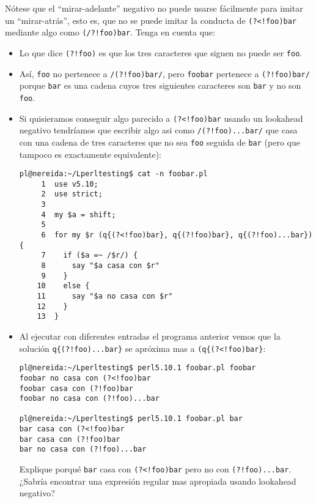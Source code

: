 
Nótese que el ``mirar-adelante'' negativo
no puede usarse fácilmente para imitar un ``mirar-atrás'',
esto es, que no se puede imitar la conducta de
\verb|(?<!foo)bar| mediante
algo como \verb|(/?!foo)bar|. Tenga en cuenta que:

\begin{itemize}

\item
Lo que 
dice \verb|(?!foo)| es que los tres caracteres que siguen no puede ser \verb"foo".  

\item
Así, \verb|foo| no pertenece a \verb|/(?!foo)bar/|, pero
\verb|foobar| pertenece a  \verb|(?!foo)bar/| porque \verb|bar| es una cadena
cuyos tres siguientes caracteres son \verb|bar| y no son \verb|foo|.

\item
Si quisieramos conseguir algo parecido a \verb|(?<!foo)bar| usando un lookahead negativo
tendríamos que escribir algo asi como
\verb|/(?!foo)...bar/| que casa con una cadena de tres caracteres que no sea \verb|foo| seguida de 
\verb|bar| (pero que tampoco es exactamente equivalente):
\begin{verbatim}
pl@nereida:~/Lperltesting$ cat -n foobar.pl
     1  use v5.10;
     2  use strict;
     3
     4  my $a = shift;
     5
     6  for my $r (q{(?<!foo)bar}, q{(?!foo)bar}, q{(?!foo)...bar}) {
     7    if ($a =~ /$r/) {
     8      say "$a casa con $r"
     9    }
    10    else {
    11      say "$a no casa con $r"
    12    }
    13  }
\end{verbatim}

\item
Al ejecutar con diferentes entradas el programa anterior vemos que la solución 
\verb|q{(?!foo)...bar}| se apróxima mas a \verb|(q{(?<!foo)bar}|:
\begin{verbatim}
pl@nereida:~/Lperltesting$ perl5.10.1 foobar.pl foobar
foobar no casa con (?<!foo)bar
foobar casa con (?!foo)bar
foobar no casa con (?!foo)...bar

pl@nereida:~/Lperltesting$ perl5.10.1 foobar.pl bar
bar casa con (?<!foo)bar
bar casa con (?!foo)bar
bar no casa con (?!foo)...bar
\end{verbatim}

\begin{exercise}
Explique porqué \verb|bar| casa con \verb|(?<!foo)bar| pero no con \verb|(?!foo)...bar|.
¿Sabría encontrar una expresión regular mas apropiada usando lookahead negativo?
\end{exercise}


\end{itemize}
